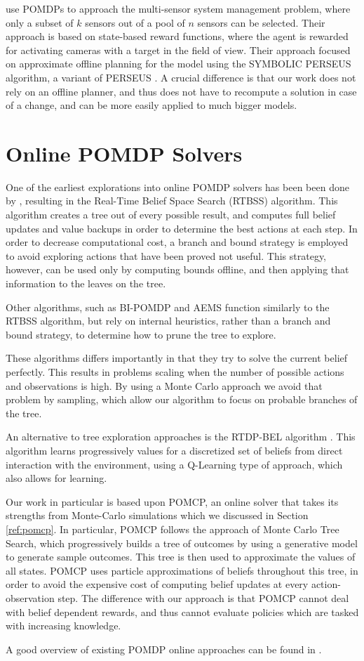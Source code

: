 \citet{cit:relworkspaan} use POMDPs to approach the multi-sensor system management problem, where
only a subset of $k$ sensors out of a pool of $n$ sensors can be selected. Their approach is based
on state-based reward functions, where the agent is rewarded for activating cameras with a target in
the field of view. Their approach focused on approximate offline planning for the model using
the SYMBOLIC PERSEUS algorithm, a variant of PERSEUS \cite{cit:perseus}. A crucial difference
is that our work does not rely on an offline planner, and thus does not have to recompute a solution
in case of a change, and can be more easily applied to much bigger models.

\section{Online POMDP Solvers}

One of the earliest explorations into online POMDP solvers has been been done by
\citet{cit:relworkonline1}, resulting in the Real-Time Belief Space Search (RTBSS) algorithm. This
algorithm creates a tree out of every possible result, and computes full belief updates and value
backups in order to determine the best actions at each step. In order to decrease computational
cost, a branch and bound strategy is employed to avoid exploring actions that have been proved not
useful. This strategy, however, can be used only by computing bounds offline, and then applying that
information to the leaves on the tree.

Other algorithms, such as BI-POMDP \cite{cit:relworkonlinebi} and AEMS \cite{cit:relworkonlineaems}
function similarly to the RTBSS algorithm, but rely on internal heuristics, rather than a branch and
bound strategy, to determine how to prune the tree to explore.

These algorithms differs importantly in that they try to solve the current belief perfectly. This
results in problems scaling when the number of possible actions and observations is high. By using
a Monte Carlo approach we avoid that problem by sampling, which allow our algorithm to focus on
probable branches of the tree.

An alternative to tree exploration approaches is the RTDP-BEL algorithm \cite{cit:relworkonlineq}.
This algorithm learns progressively values for a discretized set of beliefs from direct interaction
with the environment, using a Q-Learning type of approach, which also allows for learning.

Our work in particular is based upon POMCP, an online solver that takes its strengths from
Monte-Carlo simulations \cite{cit:pomcp} which we discussed in Section \ref{ref:pomcp}. In
particular, POMCP follows the approach of Monte Carlo Tree Search, which progressively builds a tree
of outcomes by using a generative model to generate sample outcomes. This tree is then used to
approximate the values of all states. POMCP uses particle approximations of beliefs throughout this
tree, in order to avoid the expensive cost of computing belief updates at every action-observation
step. The difference with our approach is that POMCP cannot deal with belief dependent rewards, and
thus cannot evaluate policies which are tasked with increasing knowledge.

A good overview of existing POMDP online approaches can be found in \cite{cit:relworkonlineall}.
